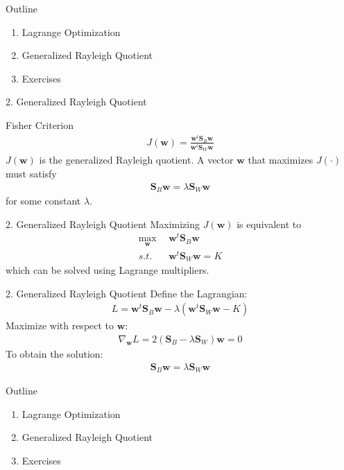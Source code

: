 \documentclass[compress,blue]{beamer}
\newcommand{\bw}{\mathbf{w}}
\newcommand{\bS}{\mathbf{S}}
\begin{document}
\begin{frame}{Outline}
	\begin{enumerate}
		\item<1-2> Lagrange Optimization
		\vspace{0.1in}
		\item<2> Generalized Rayleigh Quotient 
		\vspace{0.1in}
		\item<0> Exercises 
	\end{enumerate}
\end{frame}

\begin{frame}{2. Generalized Rayleigh Quotient }
	\begin{block}{Fisher Criterion}
		\begin{align}
			J(\bw) = \frac{\bw^t  \bS_B \bw}{\bw^t \bS_W \bw}
		\end{align}
		$J(\bw)$ is the generalized Rayleigh quotient. A vector $\bw$ that maximizes $J(\cdot)$ must satisfy 
		\begin{align}
			\bS_B\bw = \lambda\bS_W\bw
		\end{align}
		for some constant $\lambda$.
	\end{block}	
\end{frame}

\begin{frame}{2. Generalized Rayleigh Quotient}
	Maximizing $J(\bw)$ is equivalent to 
	\begin{align}
		\max_{\bw} ~~& \bw^t \bS_B \bw \\
		s.t. ~~~& \bw^t \bS_W \bw = K
	\end{align}
	which can be solved using Lagrange multipliers.
\end{frame}

\begin{frame}{2. Generalized Rayleigh Quotient}
	Define the 	Lagrangian:
	\begin{align}
		L = \bw^t\bS_B\bw - \lambda (\bw^t \bS_W \bw - K)
	\end{align} 
	Maximize with respect to $\bw$:
	\begin{align}
		\nabla_{\bw}L = 2(\bS_B - \lambda\bS_W)\bw = 0
	\end{align}
	To obtain the solution:
	\begin{align}
		\bS_B\bw = \lambda \bS_W\bw
	\end{align}
\end{frame}

\begin{frame}{Outline}
	\begin{enumerate}
		\item<1-2> Lagrange Optimization
		\vspace{0.1in}
		\item<1-2> Generalized Rayleigh Quotient 
		\vspace{0.1in}
		\item<2> Exercises 
	\end{enumerate}
\end{frame}
\end{document}
